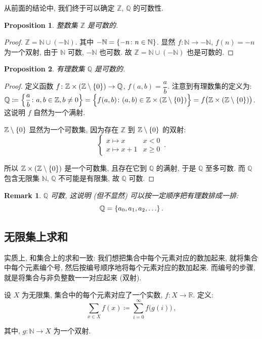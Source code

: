 \documentclass[UTF8]{ctexart}
\theoremstyle{mystyle}
\newtheorem{proposition}{Proposition}[section]
\theoremstyle{myremark}
\newtheorem*{remark}{Remark}
\theoremstyle{plain}
\newcommand{\R}{\mathbb R}
\newcommand{\Z}{\mathbb Z}
\newcommand{\N}{\mathbb N}
\newcommand{\Q}{\mathbb Q}
\DeclarePairedDelimiter\set{\{}{\}}
\begin{document}
从前面的结论中, 我们终于可以确定 $ \Z $, $ \Q $ 的可数性.

\begin{proposition}
    整数集 $ \Z $ 是可数的.
\end{proposition}

\begin{proof}
    $ \Z = \N \cup (-\N) $. 其中 $ -\N = \set{-n \colon n \in \N} $. 显然 $ f \colon \N \to -\N $, $ f(n) = -n $ 为一个双射, 由于 $ \N $ 可数, $ -\N $ 也可数. 故 $ \Z = \N \cup (-\N) $ 也是可数的.
\end{proof}

\begin{proposition}
    有理数集 $ \Q $ 是可数的.
\end{proposition}

\begin{proof}
    定义函数 $ f \colon \Z \times (\Z \setminus \set{0}) \to \Q $, $ f(a, b) = \dfrac{a}{b} $. 注意到有理数集的定义为: $ \Q \coloneqq \set[\Big]{\dfrac{a}{b} \colon a, b \in \Z, b \neq 0} = \set[\Big]{f(a, b) \colon (a, b) \in \Z \times (\Z \setminus \set{0})} = f \big( \Z \times (\Z \setminus \set{0}) \big) $. 这说明 $ f $ 自然为一个满射.

    $ \Z \setminus \set{0} $ 显然为一个可数集, 因为存在 $ \Z $ 到 $ \Z \setminus \set{0} $ 的双射:
    \[ \begin{cases}
        x \mapsto x & x < 0 \\
        x \mapsto x + 1 & x \geqslant 0
    \end{cases} \,.\]

    所以 $ \Z \times (\Z \setminus \set{0}) $ 是一个可数集, 且存在它到 $ \Q $ 的满射, 于是 $ \Q $ 至多可数. 而 $ \Q $ 包含无限集 $ \N $, $ \Q $ 不可能是有限集, 故 $ \Q $ 可数.
\end{proof}

\begin{remark}
    $ \Q $ 可数, 这说明 (但不显然) 可以按一定顺序把有理数排成一排: \[ \Q = \set{a_0, a_1, a_2, \dots} \,.\]
\end{remark}


\subsection{无限集上求和}
实质上, 和集合上的求和一致: 我们想把集合中每个元素对应的数加起来, 就将集合中每个元素编个号, 然后按编号顺序地将每个元素对应的数加起来. 而编号的步骤, 就是将集合与非负整数一一对应起来 (双射).
    
\begin{definition}
    设 $ X $ 为无限集, 集合中的每个元素对应了一个实数, $ f \colon X \to \R $. 定义:
    \[ \sum_{x \in X} f(x) \coloneqq \sum_{i = 0}^\infty f \big( g(i) \big) \,,\]

    其中, $ g \colon \N \to X $ 为一个双射.
\end{definition}
\end{document}
